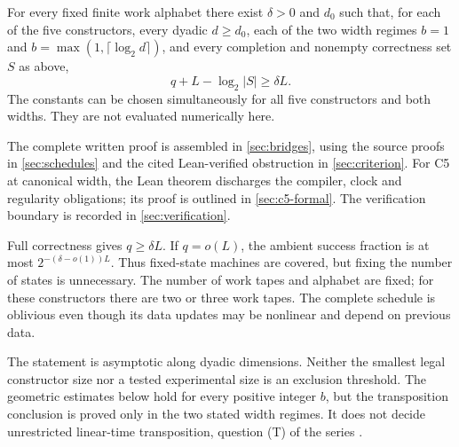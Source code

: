 \begin{theorem}
\label{thm:cascades}
For every fixed finite work alphabet there exist $\delta>0$ and $d_0$
such that, for each of the five constructors, every dyadic $d\ge d_0$,
each of the two width regimes $b=1$ and $b=\max(1,\lceil\log_2d\rceil)$,
and every completion and nonempty correctness set $S$ as above,
\begin{equation}
\label{eq:main}
                 q+L-\log_2|S|\ge\delta L.
\end{equation}
The constants can be chosen simultaneously for all five constructors and
both widths. They are not evaluated numerically here.
\end{theorem}
The complete written proof is assembled in \cref{sec:bridges}, using the
source proofs in \cref{sec:schedules} and the cited Lean-verified obstruction
in \cref{sec:criterion}. For C5 at canonical width, the Lean theorem
discharges the compiler, clock and regularity obligations; its proof is
outlined in \cref{sec:c5-formal}. The verification boundary is recorded in
\cref{sec:verification}.

Full correctness gives $q\ge\delta L$. If $q=o(L)$, the ambient success
fraction is at most $2^{-(\delta-o(1))L}$. Thus fixed-state machines are
covered, but fixing the number of states is unnecessary. The number of
work tapes and alphabet are fixed; for these constructors there are two
or three work tapes. The complete schedule is oblivious even though its
data updates may be nonlinear and depend on previous data.

The statement is asymptotic along dyadic dimensions. Neither the smallest
legal constructor size nor a tested experimental size is an exclusion
threshold. The geometric estimates below hold for every positive integer
$b$, but the transposition conclusion is proved only in the two stated
width regimes. It does not decide unrestricted linear-time transposition,
question (T) of the series \cite{FirstPaper2026}.
